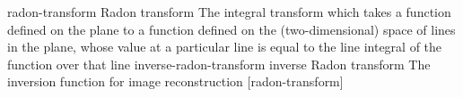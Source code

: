\newglsXterm%
{radon-transform}%
{Radon transform}%
{The integral transform which takes a function  defined on the plane to a function  defined on the (two-dimensional) space of lines in the plane, whose value at a particular line is equal to the line integral of the function over that line}%
\newglsXterm%
{inverse-radon-transform}%
{inverse Radon transform}%
{The inversion function for image reconstruction}%
[radon-transform]%

